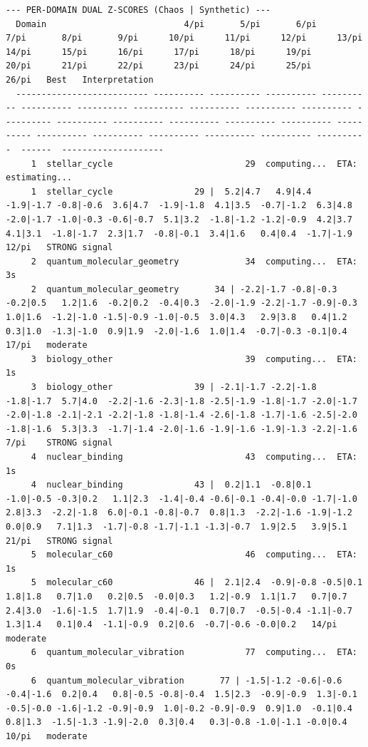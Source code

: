 \documentclass[11pt, letterpaper, openany]{book}
\begin{document}
\begin{empiricalbox}
\begin{lstlisting}[style=terminal]
--- PER-DOMAIN DUAL Z-SCORES (Chaos | Synthetic) ---
  Domain                           4/pi       5/pi       6/pi       7/pi       8/pi       9/pi      10/pi      11/pi      12/pi      13/pi      14/pi      15/pi      16/pi      17/pi      18/pi      19/pi      20/pi      21/pi      22/pi      23/pi      24/pi      25/pi      26/pi   Best   Interpretation
  -------------------------- ---------- ---------- ---------- ---------- ---------- ---------- ---------- ---------- ---------- ---------- ---------- ---------- ---------- ---------- ---------- ---------- ---------- ---------- ---------- ---------- ---------- ---------- ----------  ------  --------------------
     1  stellar_cycle                          29  computing...  ETA: estimating...
     1  stellar_cycle                29 |  5.2|4.7   4.9|4.4  -1.9|-1.7 -0.8|-0.6  3.6|4.7  -1.9|-1.8  4.1|3.5  -0.7|-1.2  6.3|4.8  -2.0|-1.7 -1.0|-0.3 -0.6|-0.7  5.1|3.2  -1.8|-1.2 -1.2|-0.9  4.2|3.7   4.1|3.1  -1.8|-1.7  2.3|1.7  -0.8|-0.1  3.4|1.6   0.4|0.4  -1.7|-1.9  12/pi   STRONG signal
     2  quantum_molecular_geometry             34  computing...  ETA: 3s
     2  quantum_molecular_geometry       34 | -2.2|-1.7 -0.8|-0.3 -0.2|0.5   1.2|1.6  -0.2|0.2  -0.4|0.3  -2.0|-1.9 -2.2|-1.7 -0.9|-0.3  1.0|1.6  -1.2|-1.0 -1.5|-0.9 -1.0|-0.5  3.0|4.3   2.9|3.8   0.4|1.2   0.3|1.0  -1.3|-1.0  0.9|1.9  -2.0|-1.6  1.0|1.4  -0.7|-0.3 -0.1|0.4   17/pi   moderate
     3  biology_other                          39  computing...  ETA: 1s
     3  biology_other                39 | -2.1|-1.7 -2.2|-1.8 -1.8|-1.7  5.7|4.0  -2.2|-1.6 -2.3|-1.8 -2.5|-1.9 -1.8|-1.7 -2.0|-1.7 -2.0|-1.8 -2.1|-2.1 -2.2|-1.8 -1.8|-1.4 -2.6|-1.8 -1.7|-1.6 -2.5|-2.0 -1.8|-1.6  5.3|3.3  -1.7|-1.4 -2.0|-1.6 -1.9|-1.6 -1.9|-1.3 -2.2|-1.6  7/pi    STRONG signal
     4  nuclear_binding                        43  computing...  ETA: 1s
     4  nuclear_binding              43 |  0.2|1.1  -0.8|0.1  -1.0|-0.5 -0.3|0.2   1.1|2.3  -1.4|-0.4 -0.6|-0.1 -0.4|-0.0 -1.7|-1.0  2.8|3.3  -2.2|-1.8  6.0|-0.1 -0.8|-0.7  0.8|1.3  -2.2|-1.6 -1.9|-1.2  0.0|0.9   7.1|1.3  -1.7|-0.8 -1.7|-1.1 -1.3|-0.7  1.9|2.5   3.9|5.1   21/pi   STRONG signal
     5  molecular_c60                          46  computing...  ETA: 1s
     5  molecular_c60                46 |  2.1|2.4  -0.9|-0.8 -0.5|0.1   1.8|1.8   0.7|1.0   0.2|0.5  -0.0|0.3   1.2|-0.9  1.1|1.7   0.7|0.7   2.4|3.0  -1.6|-1.5  1.7|1.9  -0.4|-0.1  0.7|0.7  -0.5|-0.4 -1.1|-0.7  1.3|1.4   0.1|0.4  -1.1|-0.9  0.2|0.6  -0.7|-0.6 -0.0|0.2   14/pi   moderate
     6  quantum_molecular_vibration            77  computing...  ETA: 0s
     6  quantum_molecular_vibration       77 | -1.5|-1.2 -0.6|-0.6 -0.4|-1.6  0.2|0.4   0.8|-0.5 -0.8|-0.4  1.5|2.3  -0.9|-0.9  1.3|-0.1 -0.5|-0.0 -1.6|-1.2 -0.9|-0.9  1.0|-0.2 -0.9|-0.9  0.9|1.0  -0.1|0.4   0.8|1.3  -1.5|-1.3 -1.9|-2.0  0.3|0.4   0.3|-0.8 -1.0|-1.1 -0.0|0.4   10/pi   moderate

\end{lstlisting}
\end{empiricalbox}
\end{document}
